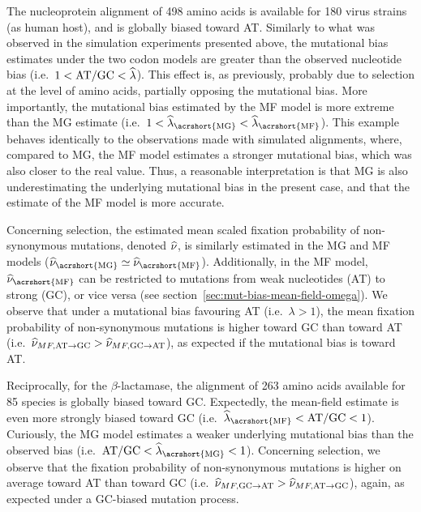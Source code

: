 The nucleoprotein alignment of 498 amino acids is available for 180 virus strains (as human host), and is globally biased toward AT.
Similarly to what was observed in the simulation experiments presented above, the mutational bias estimates under the two \gls{codon} models are greater than the observed nucleotide bias (i.e.~$1 < \text{AT/GC} < \widehat{\lambda}$).
This effect is, as previously, probably due to selection at the level of amino acids, partially opposing the mutational bias.
More importantly, the mutational bias estimated by the \acrshort{MF} model is more extreme than the \acrshort{MG} estimate (i.e.~$1 < \widehat{\lambda}_{\text{\acrshort{MG}}} < \widehat{\lambda}_{\text{\acrshort{MF}}}$).
This example behaves identically to the observations made with simulated alignments, where, compared to \acrshort{MG}, the \acrshort{MF} model estimates a stronger mutational bias, which was also closer to the real value.
Thus, a reasonable interpretation is that \acrshort{MG} is also underestimating the underlying mutational bias in the present case, and that the estimate of the \acrshort{MF} model is more accurate.

Concerning selection, the estimated mean scaled fixation probability of \gls{non-synonymous} mutations, denoted $\widehat{\nu}$, is similarly estimated in the \acrshort{MG} and \acrshort{MF} models ($\widehat{\avgpfix}_{\text{\acrshort{MG}}} \simeq \widehat{\avgpfix}_{\text{\acrshort{MF}}}$).
Additionally, in the \acrshort{MF} model, $\widehat{\avgpfix}_{\text{\acrshort{MF}}}$ can be restricted to mutations from weak nucleotides (AT) to strong (GC), or vice versa (see section~\ref{sec:mut-bias-mean-field-omega}).
We observe that under a mutational bias favouring AT (i.e.~$\lambda > 1$), the mean fixation probability of \gls{non-synonymous} mutations is higher toward GC than toward AT (i.e.~$\widehat{\nu}_{MF,\text{AT} \rightarrow \text{GC}} > \widehat{\nu}_{MF,\text{GC} \rightarrow \text{AT}}$), as expected if the mutational bias is toward AT.

Reciprocally, for the $\beta$-lactamase, the alignment of 263 amino acids available for 85 species is globally biased toward GC.
Expectedly, the mean-field estimate is even more strongly biased toward GC (i.e.~$\widehat{\lambda}_{\text{\acrshort{MF}}} < \atgc < 1$).
Curiously, the \acrshort{MG} model estimates a weaker underlying mutational bias than the observed bias (i.e.~$ \atgc < \widehat{\lambda}_{\text{\acrshort{MG}}} < 1$).
Concerning selection, we observe that the fixation probability of \gls{non-synonymous} mutations is higher on average toward AT than toward GC (i.e.~$\widehat{\nu}_{MF,\text{GC} \rightarrow \text{AT}} > \widehat{\nu}_{MF,\text{AT} \rightarrow \text{GC}}$), again, as expected under a GC-biased mutation process.

